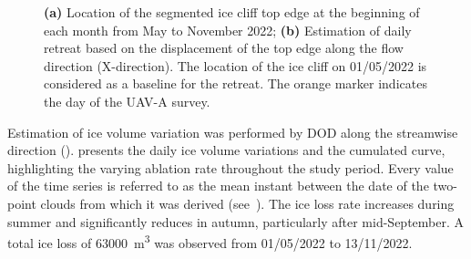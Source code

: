 \begin{figure}
  \centering
  \caption{\textbf{(a)} Location of the segmented ice cliff top edge at the beginning of each month from May to November 2022; \textbf{(b)} Estimation of daily retreat based on the displacement of the top edge along the flow direction (X-direction). The location of the ice cliff on 01/05/2022 is considered as a baseline for the retreat. The orange marker indicates the day of the UAV-A survey.}
  \label{fig:4:retreat}
\end{figure}

Estimation of ice volume variation was performed by DOD along the
streamwise direction ().
 presents the daily ice volume variations and the cumulated
curve, highlighting the varying ablation rate throughout the study period.
Every value of the time series is referred to as the mean instant between the date of the two-point clouds from which it was derived (see~).
The ice loss rate increases during summer and significantly reduces in autumn,
particularly after mid-September.
A total ice loss of \SI{63000}{\cubic\meter} was observed from 01/05/2022 to 13/11/2022.

